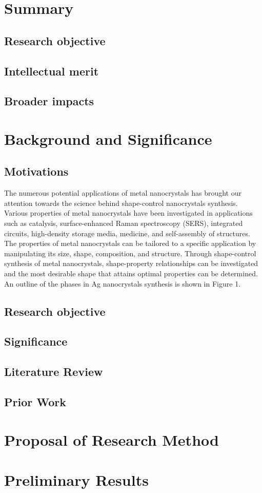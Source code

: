 \section{Summary}

\subsection{Research objective}

\subsection{Intellectual merit}

\subsection{Broader impacts}

\section{Background and Significance}

\subsection{Motivations}
The numerous potential applications of metal nanocrystals has brought our attention towards the science behind shape-control nanocrystals synthesis. Various properties of metal nanocrystals have been investigated in applications such as catalysis,\cite{Burda_2005} surface-enhanced Raman spectroscopy (SERS),\cite{McLellan_2006} integrated circuits,\cite{Wiley_2006} high-density storage media,\cite{Aslam_2005} medicine,\cite{Au_2008} and self-assembly of structures.\cite{Glotzer_2007} The properties of metal nanocrystals can be tailored to a specific application by manipulating its size, shape, composition, and structure.\cite{Xia_2008} Through shape-control synthesis of metal nanocrystals, shape-property relationships can be investigated and the most desirable shape that attains optimal properties can be determined. An outline of the phases in Ag nanocrystals synthesis is shown in Figure 1.

\subsection{Research objective}

\subsection{Significance}

\subsection{Literature Review}

\subsection{Prior Work}

\section{Proposal of Research Method}

\section{Preliminary Results}


